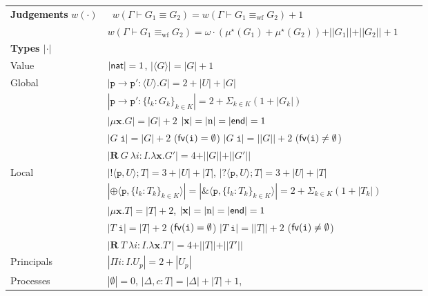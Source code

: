 \documentclass{LMCS}
\newcommand{\kf}[1]{\textup{\textsf{#1}}\xspace}
\newcommand{\participant}[1]{\ensuremath{\mathtt{#1}}}
\newcommand{\p}{\ensuremath{\participant{p}}}
\newcommand{\indexed}[4]{\ensuremath{\{#1_#3 : #2_#3\}_{#3 \in #4}}}
\newcommand{\RECSEQP}[4]{\ensuremath{\mathbf{R} \ #1\ \lambda #2.\lambda #3.#4}}
\newcommand{\G}{\ensuremath{G}}
\newcommand{\U}{\ensuremath{U}}
\newcommand{\T}{\ensuremath{T}}
\newcommand{\End}{\kf{end}}
\newcommand{\Nat}{\kf{nat}}
\newcommand{\ENCan}[1]{\langle #1 \rangle}
\newcommand{\TO}[2]{#1\to #2}
\newcommand{\GS}[3]{\TO{#1}{#2}\colon \!\ENCan{#3}}
\newcommand{\GB}[2]{\TO{#1}{#2}\colon\! \indexed{l}{\G}{k}{K}}
\newcommand{\GR}[4]{\RECSEQP{#1}{#2}{#3}{#4}}
\newcommand{\GM}[2]{\mu #1.#2}
\newcommand{\Lout}[3]{\ensuremath{!\langle #1,#2\rangle;#3}}
\newcommand{\Lin}[3]{\ensuremath{?\langle #1,#2\rangle;#3}}
\newcommand{\Lsel}[2]{\ensuremath{\oplus\langle#1,\{l_k:#2\}_{k\in
K}\rangle}}
\newcommand{\Lbranch}[2]{\ensuremath{\&\langle#1,\{l_k:#2\}_{k\in K}\rangle}}
\newcommand{\LM}[2]{\ensuremath{\mu #1.#2}}
\newcommand{\APP}{\;}
\newcommand{\mar}[1]{\ensuremath{\langle #1 \rangle}}
\newcommand{\fv}{\kf{fv}}
\newcommand{\ii}{\ensuremath{i}}
\newcommand{\n}{\ensuremath{\mathrm{n}}}
\newcommand{\xx}{\ensuremath{\mathbf{x}}}
\newcommand{\II}{\ensuremath{I}}
\newcommand{\AT}[2]{#1\! : \! #2}
\newcommand{\tii}{\ensuremath{\mathtt{i}}}
\newcommand{\proves}{\vdash}                        \newcommand{\judg}{{J}}
\newcommand{\equivwf}{\equiv_{\text{wf}}}
\newcommand{\gequivwf}{\equiv}
\newcommand{\termsize}[1]{|#1|}
\newcommand{\inductiontermsize}[1]{\vert\vert #1 \vert\vert}
\newcommand{\judgementsize}[1]{w(#1)}
\newcommand{\inductionreductionsize}[1]{\mu^\star(#1)}
\begin{document}
\begin{figure}
\centering
\begin{tabular}{l@{\ }l@{\ }l@{\quad}l}
{\bf Judgements} $\judgementsize{\cdot}$&  
\ 
$\judgementsize{\Gamma \proves G_1 \gequivwf G_2}=
\judgementsize{\Gamma \proves G_1 \equivwf G_2}+1$
\\[1mm]
& 
$\judgementsize{\Gamma \proves G_1 \equivwf G_2}=
\omega\cdot(\inductionreductionsize{G_1}+\inductionreductionsize{G_2})+
\inductiontermsize{G_1}+\inductiontermsize{G_2}+1
$
\\[1mm]
{\bf Types $|\cdot|$} \\[2mm]
Value \quad& $\termsize{\Nat}=1$, 
             $\termsize{\mar\G}= \termsize{G}+1$\\[1mm]
Global \quad & $\termsize{\GS{\p}{\p'}{\U}.\G}=
   2+\termsize{\U}+\termsize{\G}$\\[1mm]
& $\termsize{\GB{\p}{\p'}}=2+\Sigma_{k\in K} (1+ \termsize{G_k})$\\[1mm]
& $\termsize{\GM{\xx}{\G}}=\termsize{\G}+2$ \quad \quad
  $\termsize{\xx}=\termsize{\n}=\termsize{\End}=1$\\[1mm]
& 
$\termsize{\G\APP \tii}=\termsize{G}+2$ \quad ($\fv(\tii)=\emptyset$) 
\quad\quad 
$\termsize{\G\APP \tii}=\inductiontermsize{G}+2$ \quad 
($\fv(\tii)\not=\emptyset$) 
\\[1mm]
&
$\termsize{\GR{\G}{\AT{\ii}{\II}}{\xx}{\G'}}=
   4+\inductiontermsize{G}+\inductiontermsize{G'}$\\[1mm]
Local\quad &
  $\termsize{\Lout{\p}{\U}{\T}}=3+\termsize{\U}+\termsize{\T}$, 
  \quad 
  $\termsize{\Lin{\p}{\U}{\T}}=3+\termsize{\U}+\termsize{\T}$\\[1mm] 
  & $\termsize{\Lsel{\p}{\T_k}}= \termsize{\Lbranch{\p}{\T_k}}
     =2+\Sigma_{k\in K}(1+\termsize{T_k})$\\[1mm] 
   & $\termsize{\LM{\xx}{\T}} =\termsize{\T}+2$, 
\quad $\termsize{\xx}=\termsize{\n}=\termsize{\End}=1$\\[1mm]
& 
$\termsize{T\APP \tii}=\termsize{T}+2$ \quad
($\fv(\tii)=\emptyset$) 
\quad 
$\termsize{T\APP \tii}=\inductiontermsize{T}+2$ \quad
($\fv(\tii)\not=\emptyset$) 
\\[1mm] & 
$\termsize{\GR{\T}{\AT{\ii}{\II}}{\xx}{\T'}}=
   4+\inductiontermsize{T}+\inductiontermsize{T'}$\\[1mm]
Principals & 
$\termsize{\Pi\AT{\ii}{\II}.{U_p}}= 2 + \termsize{U_p}$\\[1mm]
Processes  & 
$\termsize{\emptyset}=0$, 
$\termsize{\Delta,\AT{c}{\T}}=\termsize{\Delta}+\termsize{\T}+1$,

\end{tabular}
\end{figure}
\end{document}
